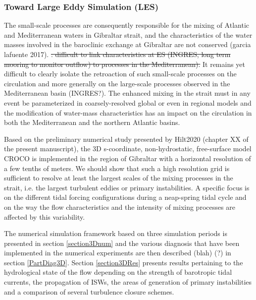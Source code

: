 \subsubsection{Toward Large Eddy Simulation (LES)}

The small-scale processes are consequently responsible for the mixing of Atlantic and Mediterranean waters in Gibraltar strait, and the characteristics of the water masses involved in the baroclinic exchange at Gibraltar are not conserved (garcia lafuente 2017). \color{blue} \sout{: difficult to link characteristics at ES (INGRES, long term mooring to monitor outflow) to processes in the Mediterranean).} It remains yet difficult to clearly isolate the retroaction of such small-scale processes on the circulation and more generally on the large-scale processes observed in the Mediterranean basin  (INGRES?). \color{black}
The enhanced mixing in the strait must in any event be \color{black}parameterized in coarsely-resolved global or even in regional models and the modification of water-mass characteristics \color{black} has an impact on the circulation in both the Mediterranean and the northern Atlantic basins. 

Based on the preliminary numerical study presented by Hilt2020 \color{blue}(chapter XX of the present manuscript), the 3D s-coordinate, non-hydrostatic, free-surface model CROCO is implemented in the region of Gibraltar with a horizontal resolution of a few tenths of meters. We should show that such a high resolution grid is sufficient to resolve at least the largest scales of the mixing processes in the strait, i.e. the largest turbulent eddies or primary instabilities. A specific focus is on the \color{black} different tidal forcing configurations during a neap-spring tidal cycle \color{blue} and on the way the flow characteristics and the intensity of mixing processes are affected by this variability. \color{black}

The numerical simulation framework \color{blue} based on three simulation periods is presented in section \ref{section3Dnum} and the various diagnosis that have been implemented in the numerical experiments are then described (blah) (?) in section \ref{PartDiag3D}. Section \ref{section3DRes} presents results pertaining to the hydrological state of the flow depending on the strength of barotropic tidal currents, the propagation of ISWs, the areas of generation of primary instabilities and a comparison of several turbulence closure schemes.\color{black}

